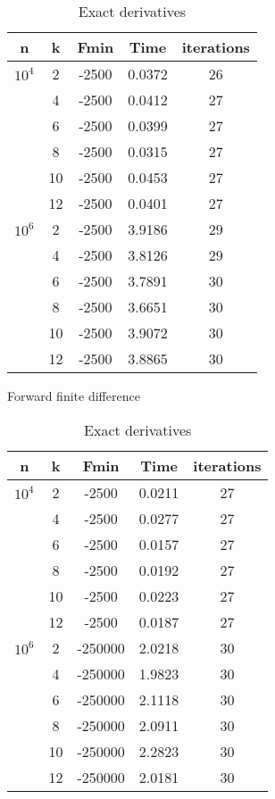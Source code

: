 \documentclass{article}
\begin{document}
\begin{table}[!htb]
    
    \begin{minipage}{.5\linewidth}
      
      \centering
        \begin{tabular}{|c c c c c |} 
 \hline
 n & k & Fmin & Time & iterations  \\ [0.5ex] 
 \hline\hline

   $10^{4}$ & 2 & -2500 &  0.0372 & 26 \\ 
  &  4 & -2500 &  0.0412 & 27\\
  &  6 & -2500 & 0.0399 & 27 \\
  &  8 & -2500 & 0.0315 & 27 \\
  &  10 & -2500 & 0.0453 & 27 \\
  &  12 & -2500 & 0.0401 & 27 \\
  \hline
     $10^{6}$ & 2 & -2500 &  3.9186 & 29 \\ 
  &  4 & -2500 &  3.8126 & 29\\
  &  6 & -2500 & 3.7891 & 30 \\
  &  8 & -2500 & 3.6651 & 30 \\
  &  10 & -2500 & 3.9072 & 30 \\
  &  12 & -2500 & 3.8865 & 30 \\
 \hline
 \end{tabular}
 \caption{Forward finite difference}
    \end{minipage}%
    \begin{minipage}{.5\linewidth}
      \centering
        \begin{tabular}{|c c c c c |} 
 \hline
 n & k & Fmin & Time & iterations  \\ [0.5ex] 
 \hline\hline

   $10^{4}$ & 2 & -2500 &  0.0211 & 27 \\ 
  &  4 & -2500 &  0.0277 & 27\\
  &  6 & -2500 & 0.0157 & 27 \\
  &  8 & -2500 & 0.0192 & 27 \\
  &  10 & -2500 & 0.0223 & 27 \\
  &  12 & -2500 & 0.0187 & 27 \\
  \hline
  $10^{6}$ & 2 & -250000 & 2.0218 & 30 \\ 
  &  4 & -250000 & 1.9823 & 30\\
  &  6 & -250000 & 2.1118 & 30\\
  &  8 & -250000 &  2.0911 & 30 \\
  &  10 & -250000 & 2.2823 & 30\\
  &  12 & -250000 & 2.0181 & 30 \\
 \hline
 \end{tabular}
 \caption{Exact derivatives}
    \end{minipage} 
\end{table}
\end{document}

